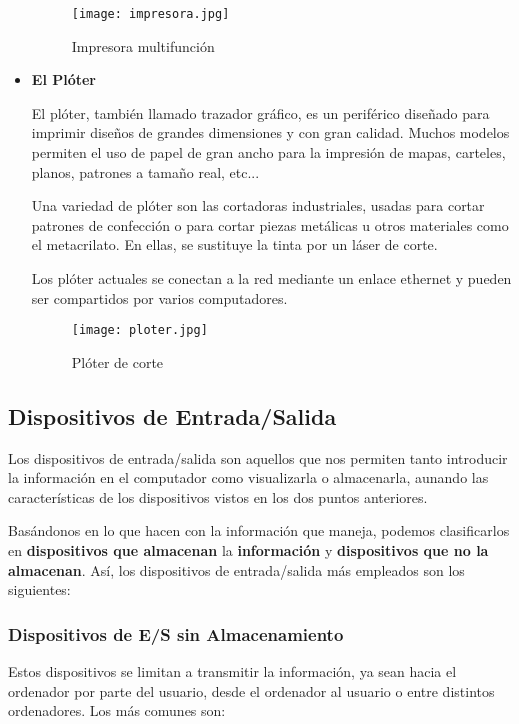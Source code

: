\begin{itemize}
    \begin{figure}[ht]
        \centering
        \texttt{[image: impresora.jpg]}
        \caption{Impresora multifunción}
    \end{figure}

    \item \textbf{El Plóter}

    El plóter, también llamado trazador gráfico, es un periférico diseñado para imprimir diseños de grandes dimensiones y con gran calidad. Muchos modelos permiten el uso de papel de gran ancho para la impresión de mapas, carteles, planos, patrones a tamaño real, etc...

    Una variedad de plóter son las cortadoras industriales, usadas para cortar patrones de confección o para cortar piezas metálicas u otros materiales como el metacrilato. En ellas, se sustituye la tinta por un láser de corte.

    Los plóter actuales se conectan a la red mediante un enlace ethernet y pueden ser compartidos por varios computadores.

    \begin{figure}[ht]
        \centering
        \texttt{[image: ploter.jpg]}
        \caption{Plóter de corte}
    \end{figure}
\end{itemize}

\subsection{Dispositivos de Entrada/Salida}
Los dispositivos de entrada/salida son aquellos que nos permiten tanto introducir la información en el computador como visualizarla o almacenarla, aunando las características de los dispositivos vistos en los dos puntos anteriores.

Basándonos en lo que hacen con la información que maneja, podemos clasificarlos en \textbf{dispositivos que almacenan} la \textbf{información} y \textbf{dispositivos que no la almacenan}. Así, los dispositivos de entrada/salida más empleados son los siguientes:

\subsubsection{Dispositivos de E/S sin Almacenamiento}

Estos dispositivos se limitan a transmitir la información, ya sean hacia el ordenador por parte del usuario, desde el ordenador al usuario o entre distintos ordenadores. Los más comunes son:

